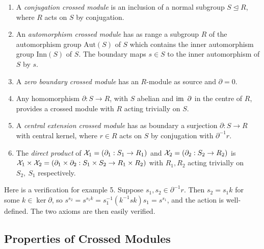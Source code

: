 \begin{enumerate}
\item A \emph{conjugation crossed module} 
      is an inclusion of a normal subgroup  $S \unlhd R$,
      where $R$ acts on $S$ by conjugation.
\item An \emph{automorphism crossed module}
      has as range a subgroup $R$
      of the automorphism group  $\mbox{Aut}(S)$  of  $S$  which
      contains the inner automorphism group  $\mbox{Inn}(S)$  of  $S$.
      The boundary maps $s \in S$  to the inner automorphism of $S$ by $s$.
\item A \emph{zero boundary crossed module}  
      has an $R$-module as source and $\partial = 0$.
\item Any homomorphism  $\partial : S \to R$,  with $S$ abelian
      and $\mathrm{im}\, ~\partial$ in the centre of $R$, provides a crossed module
      with  $R$  acting trivially on  $S$.
\item A \emph{central extension crossed module} 
      has as boundary a surjection
      $\partial : S \to R$ with central kernel,
      where $r \in R$ acts on $S$ by conjugation with $\partial^{-1}r$.
\item The \emph{direct product} of  
      $\mathcal{X}_1 = (\partial_1 : S_1 \to R_1)$ 
      and  $\mathcal{X}_2 = (\partial_2 : S_2 \to R_2)$  is
      $ \mathcal{X}_1 \times \mathcal{X}_2 = 
        (\partial_1 \times \partial_2 : S_1 \times S_2 \to R_1 \times R_2)$
      with  $R_1, R_2$  acting trivially on  $S_2,\ S_1$  respectively.
\end{enumerate}

\medskip
Here is a verification for example 5. 
Suppose $s_1,s_2 \in \partial^{-1}r$. 
Then $s_2 = s_1k$ for some $k \in \ker{\partial}$, 
so $s^{s_2} = s^{s_1k} = s_1^{-1}(k^{-1}sk)s_1 = s^{s_1}$, 
and the action is well-defined. 
The two axioms are then easily verified.

\subsection{Properties of Crossed Modules} \label{subs:xmod_prop}

